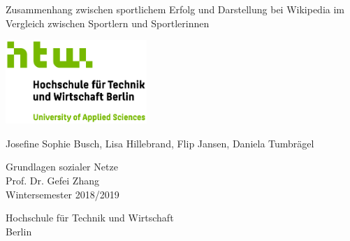 \documentclass[11pt]{article}
\begin{document}
\begin{titlepage}
   \begin{center}
       \vspace*{1cm}
       
       \Huge	
       Zusammenhang zwischen sportlichem Erfolg und Darstellung bei Wikipedia im Vergleich zwischen Sportlern und Sportlerinnen
 
       \vspace{2.0cm}
       
       \includegraphics[width=0.4\textwidth]{logo.jpg}
 
       \vspace{1.5cm}
       \LARGE
       Josefine Sophie Busch, Lisa Hillebrand, Flip Jansen, Daniela Tumbrägel
 
       \vfill
 
       Grundlagen sozialer Netze \\
       Prof. Dr. Gefei Zhang\\
       Wintersemester 2018/2019\\
 
       \vspace{0.8cm}
      
       Hochschule für Technik und Wirtschaft\\
       Berlin\\
 
   \end{center}
\end{titlepage}



\author{Lisa Hillebrand}%
\author{Josefine Sophie Busch}%
\author{Daniela Tumbrägel}%
\author{Flip Jansen}%
%





\pagebreak
\tableofcontents
\pagebreak
\listoftables
\listoffigures
\pagebreak
\end{document}

